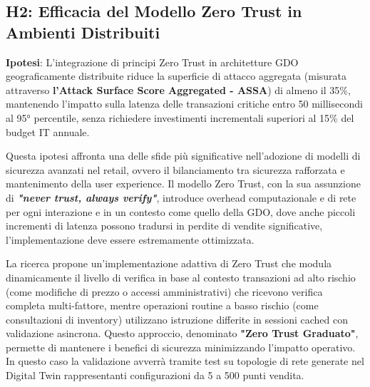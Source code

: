 \subsection{H2: Efficacia del Modello Zero Trust in Ambienti Distribuiti}

\textbf{Ipotesi}: L'integrazione di principi Zero Trust in architetture GDO geograficamente distribuite riduce la superficie di attacco aggregata (misurata attraverso \textbf{l'Attack Surface Score Aggregated - ASSA}) di almeno il 35\%, mantenendo l'impatto sulla latenza delle transazioni critiche entro 50 millisecondi al 95° percentile, senza richiedere investimenti incrementali superiori al 15\% del budget IT annuale.

Questa ipotesi affronta una delle sfide più significative nell'adozione di modelli di sicurezza avanzati nel retail, ovvero il bilanciamento tra sicurezza rafforzata e mantenimento della user experience. Il modello Zero Trust, con la sua assunzione di \textit{\textbf{"never trust, always verify"}}, introduce overhead computazionale e di rete per ogni interazione e in un contesto come quello della GDO, dove anche piccoli incrementi di latenza possono tradursi in perdite di vendite significative, l'implementazione deve essere estremamente ottimizzata.

La ricerca propone un'implementazione adattiva di Zero Trust che modula dinamicamente il livello di verifica in base al contesto transazioni ad alto rischio (come modifiche di prezzo o accessi amministrativi) che ricevono verifica completa multi-fattore, mentre operazioni routine a basso rischio (come consultazioni di inventory) utilizzano istruzione differite in sessioni cached con validazione asincrona. Questo approccio, denominato \textbf{"Zero Trust Graduato"}, permette di mantenere i benefici di sicurezza minimizzando l'impatto operativo.
In questo caso la validazione avverrà tramite test su topologie di rete generate nel Digital Twin 
rappresentanti configurazioni da 5 a 500 punti vendita.

